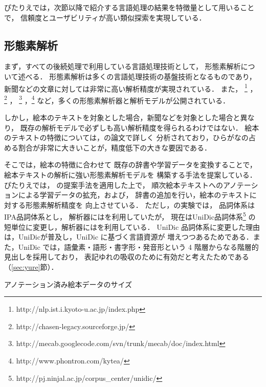 \documentclass[japanese]{jnlp_1.4}
\newcommand{\changedB}[1]{}
\renewcommand{\changedB}[1]{}
\newcommand{\mecab}{}
\newcommand{\kytea}{}
\newcommand{\chasen}{}
\newcommand{\juman}{}
\begin{document}
ぴたりえでは，次節以降で紹介する言語処理の結果を特徴量として用いることで，
信頼度とユーザビリティが高い類似探索を実現している．


\subsection{形態素解析}\label{sec:hiragana}


まず，すべての後続処理で利用している言語処理技術として，
形態素解析について述べる．
形態素解析は多くの言語処理技術の基盤技術となるものであり，
新聞などの\changedB{大人向けの整った}文章に対しては非常に高い解析精度が実現されている．
また，
\juman\footnote{http://nlp.ist.i.kyoto-u.ac.jp/index.php}
\cite{juman:7.0j}， 
 \chasen\footnote{http://chasen-legacy.sourceforge.jp/}
 \cite{chasen:2.4.4j}，
 \mecab\footnote{http://mecab.googlecode.com/svn/trunk/mecab/doc/index.html}
 \cite{Mecab}，\kytea\footnote{http://www.phontron.com/kytea/}
 \cite{Mori:Nakata:Graham:Kawahara:2011j}
など，多くの形態素解析器と解析モデルが公開されている．

しかし，絵本のテキストを対象とした場合，新聞などを対象とした場合と異なり，
既存の解析モデルで必ずしも高い解析精度を得られるわけではない．
絵本のテキストの特徴については，の論文で詳しく
分析されており，ひらがなの占める割合が非常に大きいことが，精度低下の大きな要因である．


そこでは，絵本の特徴に合わせて
既存の辞書や学習データを変換することで，絵本テキストの解析に強い形態素解析モデルを
構築する手法を提案している．
ぴたりえでは，
の提案手法を適用した上で，
順次絵本テキストへのアノテーションによる学習データの拡充，および，
辞書の追加を行い，絵本のテキストに対する形態素解析精度を
向上させている．
ただし，の実験では，
品詞体系はIPA品詞体系とし，
解析器には\kytea{}を利用していたが，
現在はUniDic品詞体系\cite{Unidic}\footnote{http://pj.ninjal.ac.jp/corpus\_center/unidic/}
の短単位に変更し，解析器には\mecab{}を利用している．
UniDic 品詞体系に変更した理由は，UniDicが普及し，UniDic に基づく言語資源が
増えつつあるためである．また，UniDic では，語彙素・語形・書字形・発音形という 4 階層からなる階層的見出しを採用しており，
表記ゆれの吸収のために有効だと考えたためである（\ref{sec:yure}節）．

\begin{table}[b]
\caption{アノテーション済み絵本データのサイズ}
\label{tb:test-size}

\end{table}
\end{document}
